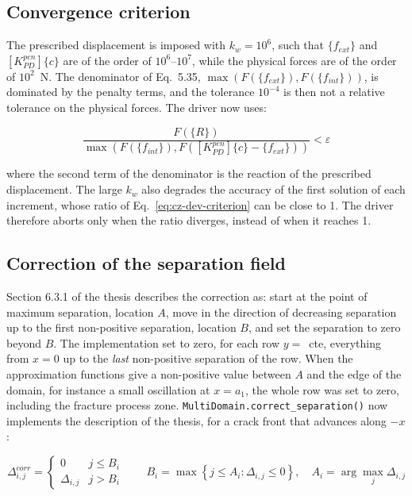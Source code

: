 \subsection{Convergence criterion}\label{sec:cz-dev-convergence}

The prescribed displacement is imposed with $k_w = 10^6$, such that $\{f_{ext}\}$ and $[K^{pen}_{PD}]\{c\}$ are of the order of $10^6$--$10^7$, while the physical forces are of the order of $10^2$~N. The denominator of Eq.~5.35, $\max(F(\{f_{ext}\}), F(\{f_{int}\}))$, is dominated by the penalty terms, and the tolerance $10^{-4}$ is then not a relative tolerance on the physical forces. The driver now uses:

\begin{equation}\label{eq:cz-dev-criterion}
	\frac{F(\{R\})}{\max\left( F(\{f_{int}\}), F([K^{pen}_{PD}]\{c\} - \{f_{ext}\}) \right)} < \varepsilon
\end{equation}

\noindent where the second term of the denominator is the reaction of the prescribed displacement. The large $k_w$ also degrades the accuracy of the first solution of each increment, whose ratio of Eq.~\ref{eq:cz-dev-criterion} can be close to 1. The driver therefore aborts only when the ratio diverges, instead of when it reaches 1.

\subsection{Correction of the separation field}\label{sec:cz-dev-correction}

Section 6.3.1 of the thesis describes the correction as: start at the point of maximum separation, location $A$, move in the direction of decreasing separation up to the first non-positive separation, location $B$, and set the separation to zero beyond $B$. The implementation set to zero, for each row $y = $~cte, everything from $x=0$ up to the \emph{last} non-positive separation of the row. When the approximation functions give a non-positive value between $A$ and the edge of the domain, for instance a small oscillation at $x = a_1$, the whole row was set to zero, including the fracture process zone. \texttt{MultiDomain.correct\_separation()} now implements the description of the thesis, for a crack front that advances along $-x$:

\begin{equation}\label{eq:cz-dev-correction}
	\Delta^{corr}_{i,j} = \begin{cases}
		0 & j \le B_i \\
		\Delta_{i,j} & j > B_i
	\end{cases}
	\qquad
	B_i = \max \left\{ j \le A_i : \Delta_{i,j} \le 0 \right\}, \quad A_i = \arg\max_j \Delta_{i,j}
\end{equation}

